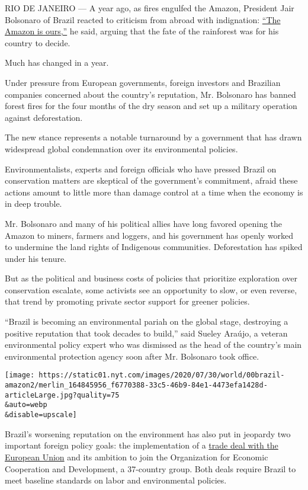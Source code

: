 RIO DE JANEIRO --- A year ago, as fires engulfed the Amazon, President
Jair Bolsonaro of Brazil reacted to criticism from abroad with
indignation:
\href{https://www.nytimes.com/2019/07/28/world/americas/brazil-deforestation-amazon-bolsonaro.html}{``The
Amazon is ours,''} he said, arguing that the fate of the rainforest was
for his country to decide.

Much has changed in a year.

Under pressure from European governments, foreign investors and
Brazilian companies concerned about the country's reputation, Mr.
Bolsonaro has banned forest fires for the four months of the dry season
and set up a military operation against deforestation.

The new stance represents a notable turnaround by a government that has
drawn widespread global condemnation over its environmental policies.

Environmentalists, experts and foreign officials who have pressed Brazil
on conservation matters are skeptical of the government's commitment,
afraid these actions amount to little more than damage control at a time
when the economy is in deep trouble.

Mr. Bolsonaro and many of his political allies have long favored opening
the Amazon to miners, farmers and loggers, and his government has openly
worked to undermine the land rights of Indigenous communities.
Deforestation has spiked under his tenure.

But as the political and business costs of policies that prioritize
exploration over conservation escalate, some activists see an
opportunity to slow, or even reverse, that trend by promoting private
sector support for greener policies.

``Brazil is becoming an environmental pariah on the global stage,
destroying a positive reputation that took decades to build,'' said
Sueley Araújo, a veteran environmental policy expert who was dismissed
as the head of the country's main environmental protection agency soon
after Mr. Bolsonaro took office.

\texttt{[image: https://static01.nyt.com/images/2020/07/30/world/00brazil-amazon2/merlin\_164845956\_f6770388-33c5-46b9-84e1-4473efa1428d-articleLarge.jpg?quality=75\\\&auto=webp\\\&disable=upscale]}

Brazil's worsening reputation on the environment has also put in
jeopardy two important foreign policy goals: the implementation of a
\href{https://www.dw.com/en/austria-deals-first-blow-to-eu-mercosur-trade-pact/a-50489747}{trade
deal with the European Union} and its ambition to join the Organization
for Economic Cooperation and Development, a 37-country group. Both deals
require Brazil to meet baseline standards on labor and environmental
policies.

